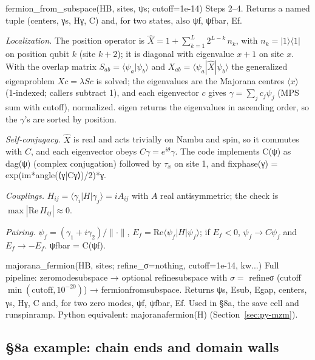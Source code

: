 \documentclass[11pt]{article}
\newcommand{\codeus}{\textunderscore\allowbreak}
\renewcommand{\code}[1]{{\ttfamily\let\_\codeus #1}}
\begin{document}
\begin{function}{fermion\_from\_subspace(HB, sites, ψs; cutoff=1e-14)}
Steps 2–4. Returns a named tuple \code{(centers, γs, Hγ, C)} and, for two states, also \code{ψf, ψfbar, E\_f}.

\emph{Localization.} The position operator is $\hat X=1+\sum_{k=1}^{L}2^{L-k}\,n_k$, with $n_k=|1\rangle\langle1|$ on position qubit $k$ (site $k+2$); it is diagonal with eigenvalue $x+1$ on site $x$. With the overlap matrix $S_{ab}=\langle\psi_a|\psi_b\rangle$ and $X_{ab}=\langle\psi_a|\hat X|\psi_b\rangle$ the generalized eigenproblem $Xc=\lambda Sc$ is solved; the eigenvalues are the Majorana centres $\langle x\rangle$ (1-indexed; callers subtract 1), and each eigenvector $c$ gives $\gamma=\sum_jc_j\psi_j$ (MPS sum with \code{cutoff}), normalized. \code{eigen} returns the eigenvalues in ascending order, so the $\gamma$'s are sorted by position.

\emph{Self-conjugacy.} $\hat X$ is real and acts trivially on Nambu and spin, so it commutes with $C$, and each eigenvector obeys $C\gamma=e^{i\theta}\gamma$. The code implements \code{C(ψ)} as \code{dag(ψ)} (complex conjugation) followed by $\tau_x$ on site 1, and \code{fixphase(γ) = exp(im*angle(⟨γ|Cγ⟩)/2)*γ}.

\emph{Couplings.} $H_{ij}=\langle\gamma_i|H|\gamma_j\rangle=iA_{ij}$ with $A$ real antisymmetric; the check is $\max|\mathrm{Re}\,H_{ij}|\approx0$.

\emph{Pairing.} $\psi_f=(\gamma_1+i\gamma_2)/\|\cdot\|$, $E_f=\mathrm{Re}\langle\psi_f|H|\psi_f\rangle$; if $E_f<0$, $\psi_f\to C\psi_f$ and $E_f\to-E_f$. \code{ψfbar = C(ψf)}.
\end{function}

\begin{function}{majorana\_fermion(HB, sites; refine\_σ=nothing, cutoff=1e-14, kw...)}
Full pipeline: \code{zero\_mode\_subspace} → optional \code{refine\_subspace} with $\sigma=$ \code{refine\_σ} (cutoff $\min(\text{cutoff},10^{-20})$) → \code{fermion\_from\_subspace}. Returns \code{ψs, E\_sub, E\_gap, centers, γs, Hγ, C} and, for two zero modes, \code{ψf, ψfbar, E\_f}. Used in §8a, the save cell and \code{run\_spin\_ramp}. Python equivalent: \code{majorana\_fermion(H)} (Section~\ref{sec:py-mzm}).
\end{function}

\subsection{§8a example: chain ends and domain walls}
\end{document}

